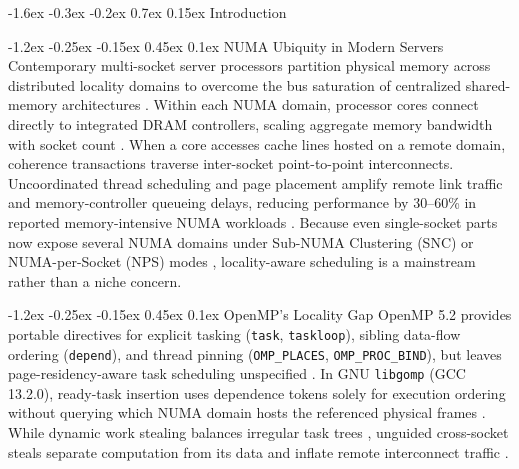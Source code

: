 \documentclass[10pt,twocolumn,letterpaper]{article}
\makeatletter
\renewcommand{\section}{\@startsection{section}{1}{\z@}%
  {-1.6ex \@plus -0.3ex \@minus -0.2ex}%
  {0.7ex \@plus 0.15ex}%
  {\normalfont\normalsize\centering\scshape}}
\renewcommand{\subsection}{\@startsection{subsection}{2}{\z@}%
  {-1.2ex \@plus -0.25ex \@minus -0.15ex}%
  {0.45ex \@plus 0.1ex}%
  {\normalfont\small\itshape}}
\makeatother
\begin{document}
\section{Introduction}

\subsection{NUMA Ubiquity in Modern Servers}
Contemporary multi-socket server processors partition physical memory across distributed locality domains to overcome the bus saturation of centralized shared-memory architectures \cite{ref1,ref2}. Within each NUMA domain, processor cores connect directly to integrated DRAM controllers, scaling aggregate memory bandwidth with socket count \cite{ref3,ref4}. When a core accesses cache lines hosted on a remote domain, coherence transactions traverse inter-socket point-to-point interconnects. Uncoordinated thread scheduling and page placement amplify remote link traffic and memory-controller queueing delays, reducing performance by 30--60\% in reported memory-intensive NUMA workloads \cite{ref5,ref6}. Because even single-socket parts now expose several NUMA domains under Sub-NUMA Clustering (SNC) or NUMA-per-Socket (NPS) modes \cite{ref21}, locality-aware scheduling is a mainstream rather than a niche concern.

\subsection{OpenMP's Locality Gap}
OpenMP 5.2 provides portable directives for explicit tasking (\texttt{task}, \texttt{taskloop}), sibling data-flow ordering (\texttt{depend}), and thread pinning (\texttt{OMP\_PLACES}, \texttt{OMP\_PROC\_BIND}), but leaves page-residency-aware task scheduling unspecified \cite{ref7}. In GNU \texttt{libgomp} (GCC 13.2.0), ready-task insertion uses dependence tokens solely for execution ordering without querying which NUMA domain hosts the referenced physical frames \cite{ref8}. While dynamic work stealing balances irregular task trees \cite{ref9}, unguided cross-socket steals separate computation from its data and inflate remote interconnect traffic \cite{ref10,ref11}.
\end{document}
